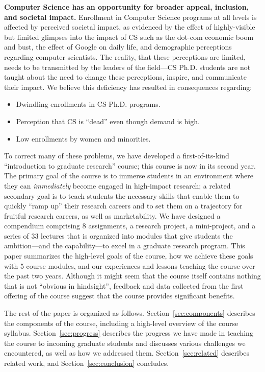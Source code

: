 {\bf Computer Science has an opportunity for broader appeal,
  inclusion, and societal impact.}  Enrollment in Computer Science
  programs at all levels is affected by perceived societal impact, as
  evidenced by the effect of highly-visible but limited glimpses into
  the impact of CS such as the dot-com economic boom and bust, the
  effect of Google on daily life, and demographic perceptions
  regarding computer scientists.  The reality, that these perceptions
  are limited, needs to be transmitted by the leaders of the field---CS
  Ph.D. students are not taught about the need to change these
  perceptions, inspire, and communicate their impact.  We believe
  this deficiency has resulted in consequences regarding:
  \begin{itemize}
\itemsep=-1pt
  \item Dwindling enrollments in CS Ph.D. programs.
  \item Perception that CS is ``dead'' even though demand is high.
  \item Low enrollments by women and minorities.
  \end{itemize}

To correct many of these problems, we have developed a first-of-its-kind
``introduction to graduate research'' course; this course is now in its
second year.  The primary goal of the course is to immerse students in
an environment where they can {\em immediately} become engaged in
high-impact research; a related secondary goal is to teach students the
necessary skills that enable them to quickly ``ramp up'' their research
careers and to set them on a trajectory for fruitful research careers,
as well as marketability.  We have designed a compendium comprising 8
assignments, a research project, a mini-project, and a series of 33
lectures that is organized into modules that give students the
ambition---and the capability---to excel in a graduate research program.
This paper summarizes the high-level goals of the course, how we achieve
these goals with 5 course modules, and our experiences and lessons
teaching the course over the past two years.  Although it might seem
that the course itself contains nothing that is not ``obvious in
hindsight'', feedback and data collected from the first offering of the
course suggest that the course provides significant benefits.



The rest of the paper is organized as follows.
Section~\ref{sec:components} describes the components of the course,
including a high-level overview of the course syllabus.
Section~\ref{sec:progress} describes the progress we have made in
teaching the course to incoming graduate students and discusses various
challenges we encountered, as well as how we addressed them.
Section~\ref{sec:related} describes related work, and
Section~\ref{sec:conclusion} concludes.

